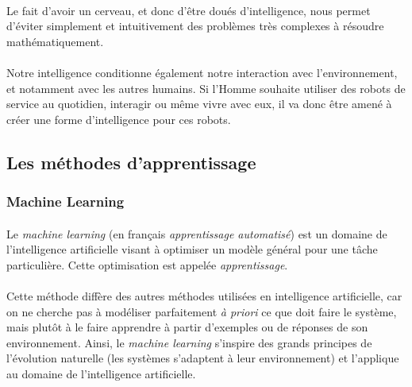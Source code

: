 \documentclass[a4paper,10pt]{article}
\begin{document}
            \paragraph{}
                Le fait d'avoir un cerveau, et donc d'être doués d'intelligence, nous permet 
                d'éviter simplement et intuitivement des problèmes très complexes à résoudre
                mathématiquement. 
            
            \paragraph{}
                Notre intelligence conditionne également notre interaction avec l'environnement, 
                et notamment avec les autres humains. Si l'Homme souhaite utiliser des 
                robots de service au quotidien, interagir ou même vivre avec eux, il va
                donc être amené à créer une forme d'intelligence pour ces robots. 
            
            \paragraph{}
                
                
        \subsection{Les méthodes d'apprentissage}
            \subsubsection{Machine Learning}
                \paragraph{}    
                    Le \textit{machine learning} (en français \textit{apprentissage automatisé}) est un 
                    domaine de l'intelligence artificielle visant à optimiser un modèle général pour une tâche 
                    particulière. Cette optimisation est appelée \textit{apprentissage}. 
                    
                \paragraph{}
                    Cette méthode diffère des autres méthodes utilisées en intelligence artificielle, car 
                    on ne cherche pas à modéliser parfaitement \textit{à priori} ce que doit faire le système, 
                    mais plutôt à le faire apprendre à partir d'exemples ou de réponses de son environnement. 
                    Ainsi, le \textit{machine learning} s'inspire des grands principes de l'évolution naturelle
                    (les systèmes s'adaptent à leur environnement) et l'applique au domaine de l'intelligence 
                    artificielle. 
                    
\end{document}
